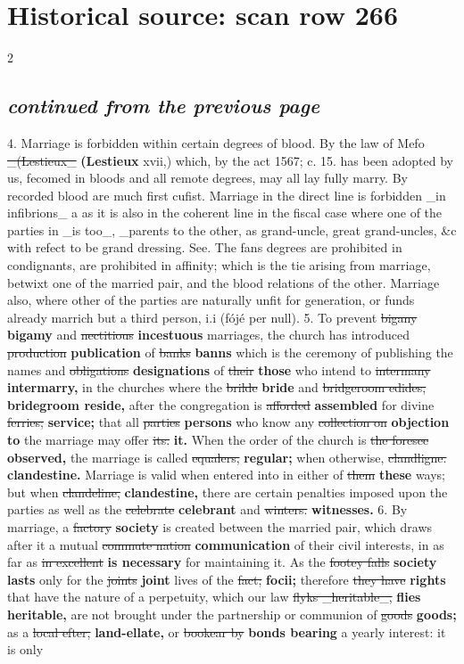 \documentclass[10pt]{article}
\begin{document}
\section*{Historical source: scan row 266}
\begin{multicols}{2}
\subsection*{\textit{continued from the previous page}}
4. Marriage is forbidden within certain degrees of blood. By the law of Mefo \sout{\_(Lestieux\_} \textbf{(Lestieux} xvii,) which, by the act 1567; c. 15. has been adopted by us, fecomed in bloods and all remote degrees, may all lay fully marry. By recorded blood are much first cufist. Marriage in the direct line is forbidden \_in infibrions\_ a as it is also in the coherent line in the fiscal case where one of the parties in \_is too\_, \_parents to the other, as grand-uncle, great grand-uncles, \&c with refect to be grand dressing. See. The fans degrees are prohibited in condignants, are prohibited in affinity; which is the tie arising from marriage, betwixt one of the married pair, and the blood relations of the other. Marriage also, where other of the parties are naturally unfit for generation, or funds already marrich but a third person, i.i (fójé per null). 5. To prevent \sout{bigany} \textbf{bigamy} and \sout{nectitious} \textbf{incestuous} marriages, the church has introduced \sout{production} \textbf{publication} of \sout{banks} \textbf{banns} which is the ceremony of publishing the names and \sout{obligations} \textbf{designations} of \sout{their} \textbf{those} who intend to \sout{intermany} \textbf{intermarry,} in the churches where the \sout{brilde} \textbf{bride} and \sout{bridgeroom edides,} \textbf{bridegroom reside,} after the congregation is \sout{afforded} \textbf{assembled} for divine \sout{ferries;} \textbf{service;} that all \sout{parties} \textbf{persons} who know any \sout{collection on} \textbf{objection to} the marriage may offer \sout{its.} \textbf{it.} When the order of the church is \sout{the foresee} \textbf{observed,} the marriage is called \sout{equalers,} \textbf{regular;} when otherwise, \sout{clandligne.} \textbf{clandestine.} Marriage is valid when entered into in either of \sout{them} \textbf{these} ways; but when \sout{clandeline,} \textbf{clandestine,} there are certain penalties imposed upon the parties as well as the \sout{celebrate} \textbf{celebrant} and \sout{winters.} \textbf{witnesses.} 6. By marriage, a \sout{factory} \textbf{society} is created between the married pair, which draws after it a mutual \sout{commute nation} \textbf{communication} of their civil interests, in as far as \sout{in excellent} \textbf{is necessary} for maintaining it. As the \sout{footey falls} \textbf{society lasts} only for the \sout{joints} \textbf{joint} lives of the \sout{fact;} \textbf{focii;} therefore \sout{they have} \textbf{rights} that have the nature of a perpetuity, which our law \sout{flyks \_heritable\_,} \textbf{flies heritable,} are not brought under the partnership or communion of \sout{goods} \textbf{goods;} as a \sout{local efter,} \textbf{land-ellate,} or \sout{bookear by} \textbf{bonds bearing} a yearly interest: it is only 
\end{multicols}
\end{document}
